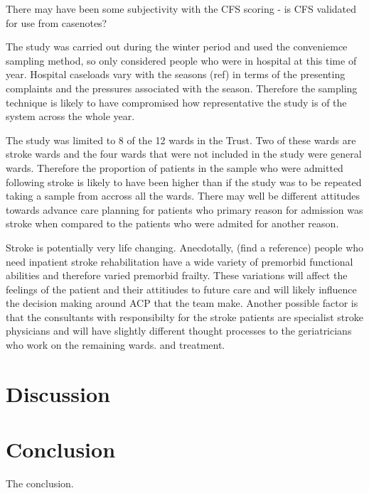 \documentclass
[
	12pt,
	a4paper,
	oneside,
]{report}
\begin{document}
There may have been some subjectivity with the CFS scoring - is CFS validated 
for use from casenotes?

The study was carried out during the winter period and used the conveniemce
sampling method, so only considered people who were in hospital at this time 
of year. Hospital caseloads vary with the seasons (ref) in terms of the 
presenting complaints and the pressures associated with the season. Therefore
the sampling technique is likely to have compromised how representative the
study is of the system across the whole year.

The study was limited to 8 of the 12 wards in the Trust. Two of these wards
are stroke wards and the four wards that were not included in the study were 
general wards. Therefore the proportion of patients in the sample
who were admitted following stroke is likely to have been higher than if the 
study was to be repeated taking a sample from accross all the wards. There may 
well be different attitudes towards advance care planning for patients who 
primary reason for admission was stroke when compared to the patients who
were admited for another reason.

Stroke is potentially very life changing. Anecdotally, (find a reference) 
people who need
inpatient stroke rehabilitation have a wide variety of premorbid functional 
abilities and therefore varied premorbid frailty. These variations will
affect the feelings of the patient and their attitiudes to future care and will
likely influence the decision making around ACP that the team make. Another
possible factor is that the consultants with responsibilty for the stroke 
patients are specialist stroke physicians and will have slightly different 
thought processes to the geriatricians who work on the remaining wards.
and treatment.

\chapter{Discussion}

\chapter{Conclusion}
The conclusion.

\printbibliography[heading=bibintoc]

\clearpage

\appendix
\end{document}
